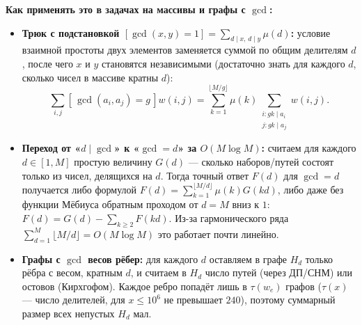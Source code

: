 \documentclass[10pt,a4paper]{article}
\renewcommand{\le}{\leqslant}
\renewcommand{\ge}{\geqslant}
\newcommand{\iverson}[1]{[\,#1\,]}
\begin{document}
\textbf{Как применять это в задачах на массивы и графы с $\gcd$:}
\begin{itemize}
  \item \textbf{Трюк с подстановкой $[\gcd(x, y) = 1] = \sum_{d \mid x,\, d \mid y} \mu(d)$:} условие взаимной простоты двух элементов заменяется суммой по общим делителям $d$, после чего $x$ и $y$ становятся независимыми (достаточно знать для каждого $d$, сколько чисел в массиве кратны $d$):
  \[
    \sum_{i, j} \iverson{\gcd(a_i, a_j) = g} w(i, j) = \sum_{k=1}^{\lfloor M / g \rfloor} \mu(k) \sum_{\substack{i : gk \mid a_i \\ j : gk \mid a_j}} w(i, j).
  \]
  \item \textbf{Переход от «$d \mid \gcd$» к «$\gcd = d$» за $O(M \log M)$:} считаем для каждого $d \in [1, M]$ простую величину $G(d)$ — сколько наборов/путей состоят только из чисел, делящихся на $d$. Тогда точный ответ $F(d)$ для $\gcd = d$ получается либо формулой $F(d) = \sum_{k=1}^{\lfloor M / d \rfloor} \mu(k) G(kd)$, либо даже без функции Мёбиуса обратным проходом от $d = M$ вниз к $1$: $F(d) = G(d) - \sum_{k \ge 2} F(kd)$. Из-за гармонического ряда $\sum_{d=1}^M \lfloor M / d \rfloor = O(M \log M)$ это работает почти линейно.
  \item \textbf{Графы с $\gcd$ весов рёбер:} для каждого $d$ оставляем в графе $H_d$ только рёбра с весом, кратным $d$, и считаем в $H_d$ число путей (через ДП/СНМ) или остовов (Кирхгофом). Каждое ребро попадёт лишь в $\tau(w_e)$ графов ($\tau(x)$ — число делителей, для $x \le 10^6$ не превышает $240$), поэтому суммарный размер всех непустых $H_d$ мал.
\end{itemize}
\end{document}
